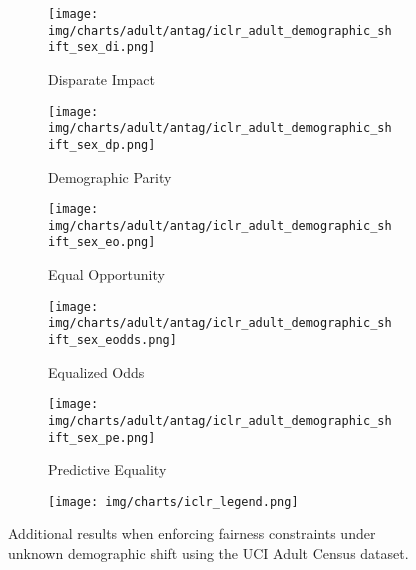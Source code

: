 \begin{figure}[h]
    \begin{subfigure}[b]{1\linewidth}
        \texttt{[image: img/charts/adult/antag/iclr\_adult\_demographic\_shift\_sex\_di.png]}
        \caption{Disparate Impact}
    \end{subfigure} 
    \begin{subfigure}[b]{1\linewidth}
        \texttt{[image: img/charts/adult/antag/iclr\_adult\_demographic\_shift\_sex\_dp.png]}
        \caption{Demographic Parity}
    \end{subfigure}
    \begin{subfigure}[b]{1\linewidth}
        \texttt{[image: img/charts/adult/antag/iclr\_adult\_demographic\_shift\_sex\_eo.png]}
        \caption{Equal Opportunity}
    \end{subfigure} 
    \begin{subfigure}[b]{1\linewidth}
        \texttt{[image: img/charts/adult/antag/iclr\_adult\_demographic\_shift\_sex\_eodds.png]}
        \caption{Equalized Odds}
    \end{subfigure} 
    \begin{subfigure}[b]{1\linewidth}
        \texttt{[image: img/charts/adult/antag/iclr\_adult\_demographic\_shift\_sex\_pe.png]}
        \caption{Predictive Equality}
    \end{subfigure} 
   \begin{subfigure}[b]{1\linewidth}
        \texttt{[image: img/charts/iclr\_legend.png]}
    \end{subfigure} 
    \caption{Additional results when enforcing fairness constraints under unknown demographic shift
using the UCI Adult Census dataset.
}
\end{figure}

\clearpage
